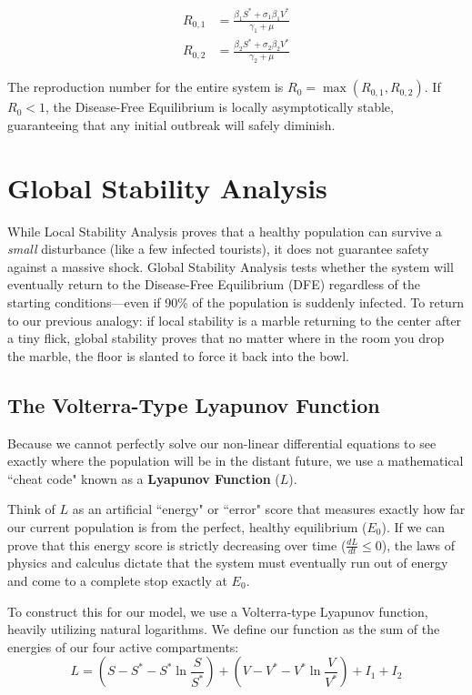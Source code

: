 \documentclass[12pt]{article}
\begin{document}
\begin{align}
R_{0,1} &= \frac{\beta_1 S^* + \sigma_1 \beta_1 V^*}{\gamma_1 + \mu} \\
R_{0,2} &= \frac{\beta_2 S^* + \sigma_2 \beta_2 V^*}{\gamma_2 + \mu}
\end{align}

The reproduction number for the entire system is $R_0 = \max(R_{0,1}, R_{0,2})$. If $R_0 < 1$, the Disease-Free Equilibrium is locally asymptotically stable, guaranteeing that any initial outbreak will safely diminish.


\section{Global Stability Analysis}

While Local Stability Analysis proves that a healthy population can survive a \textit{small} disturbance (like a few infected tourists), it does not guarantee safety against a massive shock. Global Stability Analysis tests whether the system will eventually return to the Disease-Free Equilibrium (DFE) regardless of the starting conditions—even if 90\% of the population is suddenly infected. To return to our previous analogy: if local stability is a marble returning to the center after a tiny flick, global stability proves that no matter where in the room you drop the marble, the floor is slanted to force it back into the bowl.

\subsection{The Volterra-Type Lyapunov Function}
Because we cannot perfectly solve our non-linear differential equations to see exactly where the population will be in the distant future, we use a mathematical ``cheat code" known as a \textbf{Lyapunov Function} ($L$). 

Think of $L$ as an artificial ``energy" or ``error" score that measures exactly how far our current population is from the perfect, healthy equilibrium ($E_0$). If we can prove that this energy score is strictly decreasing over time ($\frac{dL}{dt} \le 0$), the laws of physics and calculus dictate that the system must eventually run out of energy and come to a complete stop exactly at $E_0$.

To construct this for our model, we use a Volterra-type Lyapunov function, heavily utilizing natural logarithms. We define our function as the sum of the energies of our four active compartments:
\begin{equation} \label{eq:lyapunov}
L = \left( S - S^* - S^* \ln \frac{S}{S^*} \right) + \left( V - V^* - V^* \ln \frac{V}{V^*} \right) + I_1 + I_2
\end{equation}
\end{document}

